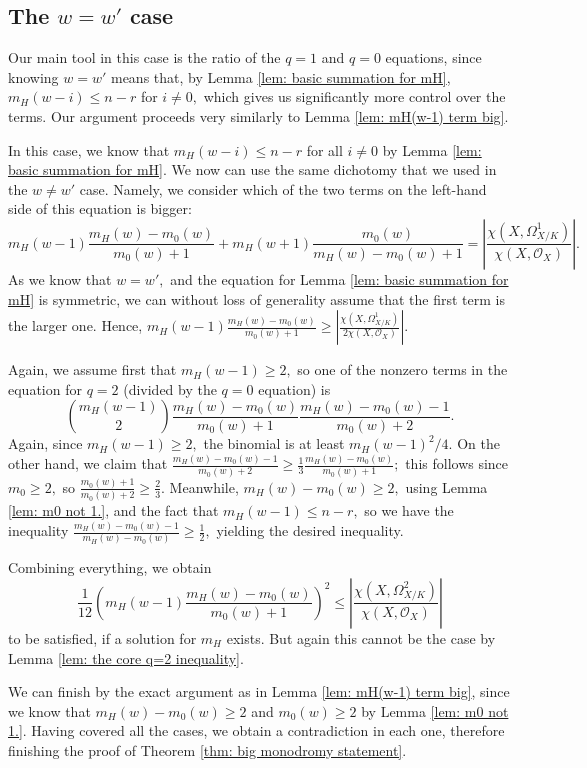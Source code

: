 \documentclass{article}
\theoremstyle{definition}
\theoremstyle{remark}
\begin{document}
\subsection{The $w = w'$ case}
Our main tool in this case is the ratio of the $q = 1$ and $q = 0$ equations, since knowing $w = w'$ means that, by Lemma \ref{lem: basic summation for mH}, $m_H(w-i) \leq n -r$ for $i \neq 0,$ which gives us significantly more control over the terms. Our argument proceeds very similarly to Lemma \ref{lem: mH(w-1) term big}.
\par In this case, we know that $m_H(w - i) \leq n-r$ for all $i \neq 0$ by Lemma \ref{lem: basic summation for mH}. We now can use the same dichotomy that we used in the $w \neq w'$ case. Namely, we consider which of the two terms on the left-hand side of this equation is bigger:
\[m_H(w-1) \frac{m_H(w) - m_0(w)}{m_0(w) + 1} + m_H(w+1) \frac{m_0(w)}{m_H(w) - m_0(w) + 1} = \left|\frac{\chi(X, \Omega^1_{X/K})}{\chi(X, \mathcal{O}_X)}\right|.\] As we know that $w = w',$ and the equation for Lemma \ref{lem: basic summation for mH} is symmetric, we can without loss of generality assume that the first term is the larger one. Hence, $m_H(w-1) \frac{m_H(w) - m_0(w)}{m_0(w) + 1} \geq \left|\frac{\chi(X, \Omega^1_{X/K})}{2\chi(X, \mathcal{O}_X)}\right|.$
\par Again, we assume first that $m_H(w-1) \geq 2,$ so one of the nonzero terms in the equation for $q = 2$ (divided by the $q=0$ equation) is $$\binom{m_H(w-1)}{2} \frac{m_H(w) - m_0(w)}{m_0(w) + 1} \frac{m_H(w) - m_0(w) - 1}{m_0(w) + 2}.$$ Again, since $m_H(w-1) \geq 2,$ the binomial is at least $m_H(w-1)^2/4.$ On the other hand, we claim that $\frac{m_H(w) - m_0(w) - 1}{m_0(w) + 2} \geq \frac{1}{3}\frac{m_H(w) - m_0(w)}{m_0(w) + 1};$ this follows since $m_0 \geq 2,$ so $\frac{m_0(w) + 1}{m_0(w) + 2} \geq \frac{2}{3}.$ Meanwhile, $m_H(w) - m_0(w) \geq 2,$ using Lemma \ref{lem: m0 not 1.}, and the fact that $m_H(w-1) \leq n-r,$ so we have the inequality $\frac{m_H(w) - m_0(w) - 1}{m_H(w) - m_0(w)} \geq \frac{1}{2},$ yielding the desired inequality. 
\par Combining everything, we obtain $$\frac{1}{12} \left(m_H(w-1) \frac{m_H(w) - m_0(w)}{m_0(w) + 1}\right)^2 \leq \left|\frac{\chi(X, \Omega^2_{X/K})}{\chi(X, \mathcal{O}_X)}\right|$$ to be satisfied, if a solution for $m_H$ exists. But again this cannot be the case by Lemma \ref{lem: the core q=2 inequality}.
\par We can finish by the exact argument as in Lemma \ref{lem: mH(w-1) term big}, since we know that $m_H(w) - m_0(w) \geq 2$ and $m_0(w) \geq 2$ by Lemma \ref{lem: m0 not 1.}. Having covered all the cases, we obtain a contradiction in each one, therefore finishing the proof of Theorem \ref{thm: big monodromy statement}.
\appendix
\end{document}
